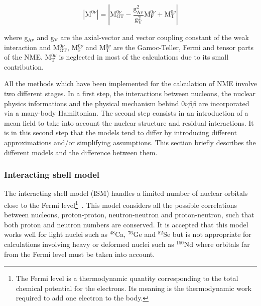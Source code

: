 \documentclass[main.tex]{subfiles}
\begin{document}

\begin{equation}
|\text{M}^{0\nu}| = |\text{M}_{\text{GT}}^{0\nu} - \frac{\text{g}_{\text{Av}}^\text{2}}{\text{g}_\text{V}^\text{2}} \text{M}_\text{F}^{0\nu} + \text{M}_\text{T}^{0\nu}|
\end{equation}


\bigskip


\NI where g$_{\text{Av}}$ and g$_\text{V}$ are the axial-vector and vector coupling constant of the weak interaction and M$_{\text{GT}}^{0\nu}$, M$_{\text{F}}^{0\nu}$ and M$_{\text{T}}^{0\nu}$ are the Gamoc-Teller, Fermi and tensor parts of the NME. M$_{\text{T}}^{0\nu}$ is neglected in most of the calculations due to its small contribution.


\bigskip


\NI All the methods which have been implemented for the calculation of NME involve two different stages. In a first step, the interactions between nucleons, the nuclear physics informations and the physical mechanism behind 0$\nu\beta\beta$ are incorporated via a many-body Hamiltonian. The second step consists in an introduction of a mean field to take into account the nuclear structure and residual interactions. It is in this second step that the models tend to differ by introducing different approximations and/or simplifying assumptions. This section briefly describes the different models and the difference between them. %


\subsubsection{Interacting shell model}


\NI The interacting shell model (ISM) handles a limited number of nuclear orbitals close to the Fermi level\footnote{The Fermi level is a thermodynamic quantity corresponding to the total chemical potential for the electrons. Its meaning is the thermodynamic work required to add one electron to the body.}~\cite{ISM_1,ISM_2,ISM_3,ISM_4}. This model considers all the possible correlations between nucleons, proton-proton, neutron-neutron and proton-neutron, such that both proton and neutron numbers are conserved. It is accepted that this model works well for light nuclei such as $^{\text{48}}$Ca, $^{\text{76}}$Ge and $^{\text{82}}$Se but is not appropriate for calculations involving heavy or deformed nuclei such as $^{\text{150}}$Nd where orbitals far from the Fermi level must be taken into account.
\end{document}
